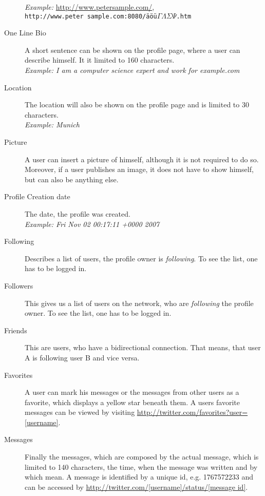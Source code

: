 \begin{description}
                     \textit{Example:} \url{http://www.petersample.com/},\\
                     \texttt{http://www.peter sample.com:8080/äöü$\Gamma\Lambda\Sigma\Psi$.htm}
\item[One Line Bio] A short sentence can be shown on the profile page, where a
                    user can describe himself. It it limited to 160
                    characters.\\
                    \textit{Example: I am a computer science expert and work
                    for example.com}
\item[Location] The location will also be shown on the profile page and is
                limited to 30 characters.\\
                \textit{Example: Munich}
\item[Picture] A user can insert a picture of himself, although it is not
               required to do so. Moreover, if a user publishes an image, it does not have to
               show himself, but can also be anything else.
\item[Profile Creation date] The date, the profile was created.\\
              \textit{Example: Fri Nov 02 00:17:11 +0000 2007}
\item[Following] Describes a list of users, the profile owner is \textit{following}.
                 To see the list, one has to be logged in.
\item[Followers] This gives us a list of users on the \Twitter{} network, who
                 are \textit{following} the profile owner. To see the list, one has to be logged in.
\item[Friends] This are users, who have a bidirectional connection. That means,
               that user A is following user B and vice versa.
\item[Favorites] A user can mark his messages or the messages from other users as
                 a favorite, which displays a
                 yellow star beneath them. A users favorite messages can be viewed
                 by visiting \url{http://twitter.com/favorites?user=[username]}.
\item[Messages] Finally the messages, which are composed by the actual message,
                which is limited to 140 characters, the time, when the message
                was written and by which mean. A message is identified by a unique
                id, e.g. 1767572233 and can be accessed by
                \url{http://twitter.com/[username]/status/[message id]}.


\end{description}
